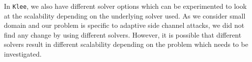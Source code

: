 \documentclass[11pt,a4paper,notitlepage]{article}
\begin{document}
In \texttt{Klee}, we also have different solver options which can be experimented to look at the scalability depending on the underlying solver used.
As we consider small domain and our problem is specific to adaptive side channel attacks, we did not find any change by using different solvers.
However, it is possible that different solvers result in different scalability depending on the problem which needs to be investigated.




\end{document}
